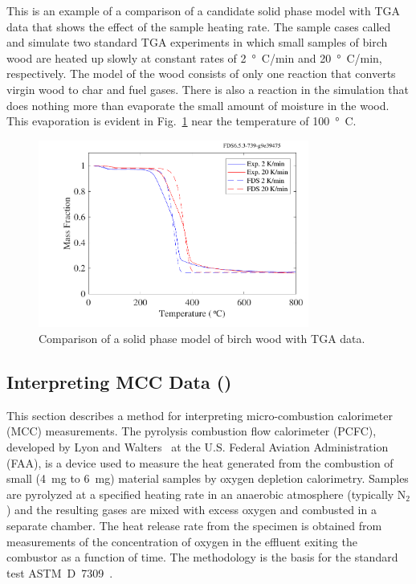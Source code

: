 \documentclass[11pt]{book}
\begin{document}
This is an example of a comparison of a candidate solid phase model with TGA data that shows the effect of the sample heating rate. The sample cases called  and  simulate two standard TGA experiments in which small samples of birch wood are heated up slowly at constant rates of 2~\si{\degree C}/min and 20~\si{\degree C}/min, respectively. The model of the wood consists of only one reaction that converts virgin wood to char and fuel gases. There is also a reaction in the simulation that does nothing more than evaporate the small amount of moisture in the wood. This evaporation is evident in Fig.~\ref{fig_birch_tga} near the temperature of 100~\si{\degree C}.
\begin{figure}[!htb]
\centering
\includegraphics[width=3.5in]{SCRIPT_FIGURES/birch_tga}
\caption[An example of TGA data]{\label{fig_birch_tga} Comparison of a solid phase model of birch wood with TGA data.}
\end{figure}



\subsection{Interpreting MCC Data (\texorpdfstring{}{cable\_XX\_mcc})}
\label{cable_11_mcc}
\label{cable_23_insulation}
\label{cable_701_insulation}
\label{cable_11_insulation}
\label{cable_11_jacket}
\label{cable_23_jacket}
\label{cable_701_jacket}

This section describes a method for interpreting micro-combustion calorimeter (MCC) measurements. The pyrolysis combustion flow calorimeter (PCFC), developed by Lyon and Walters~\cite{Lyon:JAAP2004} at the U.S. Federal Aviation Administration (FAA), is a device used to measure the heat generated from the combustion of small (4~mg to 6~mg) material samples by oxygen depletion calorimetry. Samples are pyrolyzed at a specified heating rate in an anaerobic atmosphere (typically N$_2$) and the resulting gases are mixed with excess oxygen and combusted in a separate chamber. The heat release rate from the specimen is obtained from measurements of the concentration of oxygen in the effluent exiting the combustor as a function of time. The methodology is the basis for the standard test ASTM~D~7309~\cite{microcc}.
\end{document}

